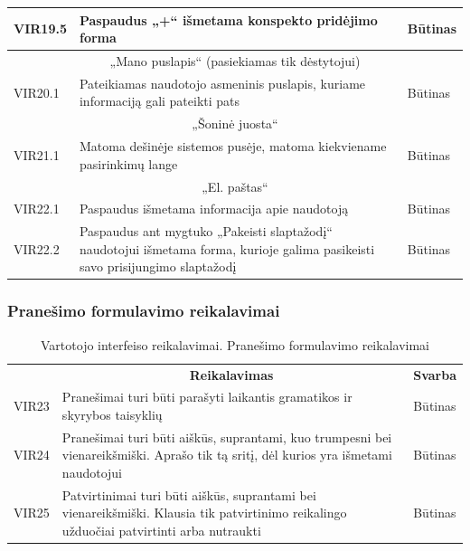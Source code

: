 \documentclass{VUMIFPSkursinis}
\begin{document}
\begin{longtable}{|p{2cm}|p{}|p{}|}
	{VIR19.5}&{Paspaudus „+“ išmetama konspekto pridėjimo forma}&{Būtinas}\\ \hline
	\multicolumn{3}{|c|}{„Mano puslapis“ (pasiekiamas tik dėstytojui)}\\ \hline
	{VIR20.1}&{Pateikiamas naudotojo asmeninis puslapis, kuriame informaciją gali pateikti pats}&{Būtinas}\\ \hline
	\multicolumn{3}{|c|}{„Šoninė juosta“}\\ \hline
	{VIR21.1}&{Matoma dešinėje sistemos pusėje, matoma kiekviename pasirinkimų lange}&{Būtinas}\\ \hline
	\multicolumn{3}{|c|}{„El. paštas“}\\ \hline
	{VIR22.1}&{Paspaudus išmetama informacija apie naudotoją}&{Būtinas}\\ \hline
	{VIR22.2}&{Paspaudus ant mygtuko „Pakeisti slaptažodį“ naudotojui išmetama forma, kurioje galima pasikeisti savo prisijungimo slaptažodį}&{Būtinas}\\ \hline
\end{longtable}

\subsubsection{Pranešimo formulavimo reikalavimai}
\begin{table}[H]
	\caption{Vartotojo interfeiso reikalavimai. Pranešimo formulavimo reikalavimai}
	\begin{tabular}{|p{2cm}|p{}|p{2cm}|}
		\hline \rowcolor{lightgray} \multicolumn{3}{|c|}{5. Pranešimo formulavimo reikalavimai}\\	\hline 
		\rowcolor{gray!50} \multicolumn{1}{|c|}{{\bfseries Kodas}}&\multicolumn{1}{c|}{{\bfseries Reikalavimas}}&\multicolumn{1}{c|}{{\bfseries Svarba}}\\ \hline
		{VIR23}&	{Pranešimai turi būti parašyti laikantis gramatikos ir skyrybos taisyklių}&{Būtinas}\\ \hline	
		{VIR24}&	{Pranešimai turi būti aiškūs, suprantami, kuo trumpesni bei vienareikšmiški. Aprašo tik tą sritį, dėl kurios yra išmetami naudotojui}&{Būtinas}\\ \hline	
		{VIR25}&	{Patvirtinimai turi būti aiškūs, suprantami bei vienareikšmiški. Klausia tik patvirtinimo reikalingo užduočiai patvirtinti arba nutraukti}&{Būtinas}\\ \hline
	\end{tabular}		
\end{table}
\end{document}
